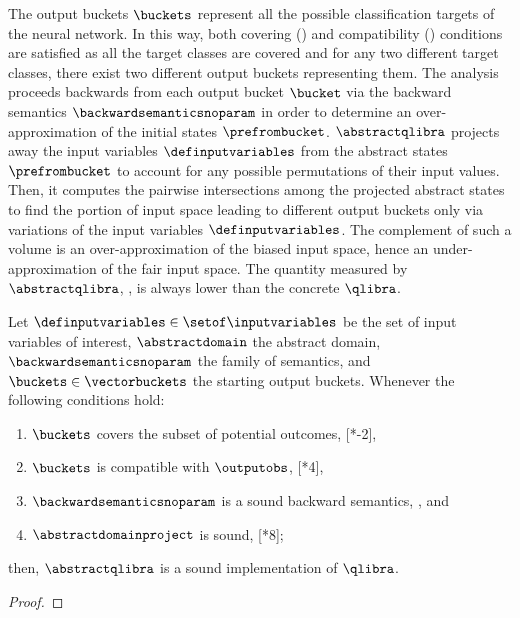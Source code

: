 The output buckets $\buckets$ represent all the possible classification targets of the neural network.
In this way, both covering () and compatibility () conditions are satisfied as all the target classes are covered and for any two different target classes, there exist two different output buckets representing them.
The analysis proceeds backwards from each output bucket $\bucket$ via the backward semantics $\backwardsemanticsnoparam$ in order to determine an over-approximation of the initial states $\prefrombucket$.
$\abstractqlibra$ projects away the input variables $\definputvariables$ from the abstract states $\prefrombucket$ to account for any possible permutations of their input values.
Then, it computes the pairwise intersections among the projected abstract states to find the portion of input space leading to different output buckets only via variations of the input variables $\definputvariables$.
The complement of such a volume is an over-approximation of the biased input space, hence an under-approximation of the fair input space.
The quantity measured by $\abstractqlibra$, \cf{} , is always lower than the concrete $\qlibra$.

\begin{lemma}
  Let $\definputvariables\in\setof\inputvariables$ be the set of input variables of interest, $\abstractdomain$ the abstract domain, $\backwardsemanticsnoparam$ the family of semantics, and $\buckets\in\vectorbuckets$ the starting output buckets.
  Whenever the following conditions hold:
  \begin{enumerate}[label=(\roman*)]
    \item \label{nioa1} $\buckets$ covers the subset of potential outcomes, \cf{} [*-2],
    \item \label{nioa2} $\buckets$ is compatible with $\outputobs$, \cf{} [*4],
    \item \label{nioa3} $\backwardsemanticsnoparam$ is a sound backward semantics, \cf{} , and
    \item \label{nioa4} $\abstractdomainproject$ is sound, \cf{} [*8];
  \end{enumerate}
  then, $\abstractqlibra$ is a sound implementation of $\qlibra$.
\end{lemma}
\begin{proof}
\end{proof}



